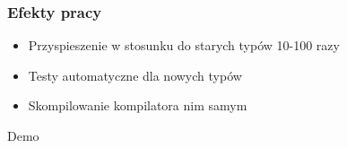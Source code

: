 \documentclass{beamer}
\begin{document}
	\begin{frame}
		\frametitle{Efekty pracy}
		\begin{itemize}
			\item Przyspieszenie w stosunku do starych typów 10-100 razy
			\item Testy automatyczne dla nowych typów
			\item Skompilowanie kompilatora nim samym
		\end{itemize}

	\end{frame}
	
	\begin{frame}[c]
		\begin{center}
			\Huge \color{blue} Demo
		\end{center}
	\end{frame}
\end{document}
